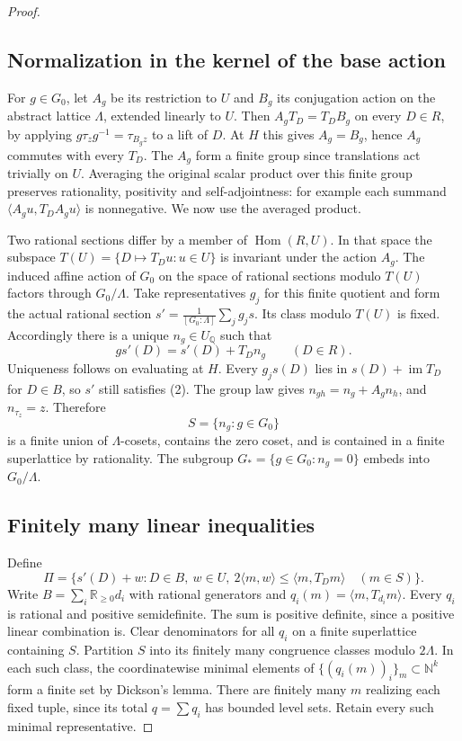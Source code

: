 \documentclass[11pt]{article}
\begin{document}
\begin{proof}
\subsection*{Normalization in the kernel of the base action}

For \(g\in G_0\), let \(A_g\) be its restriction to \(U\) and \(B_g\) its conjugation action on the abstract lattice \(\Lambda\), extended linearly to \(U\). Then \(A_g T_D=T_D B_g\) on every \(D\in R\), by applying \(g\tau_z g^{-1}=\tau_{B_gz}\) to a lift of \(D\). At \(H\) this gives \(A_g=B_g\), hence \(A_g\) commutes with every \(T_D\). The \(A_g\) form a finite group since translations act trivially on \(U\). Averaging the original scalar product over this finite group preserves rationality, positivity and self-adjointness: for example each summand \(\langle A_gu,T_D A_gu\rangle\) is nonnegative. We now use the averaged product.

Two rational sections differ by a member of \(\operatorname{Hom}(R,U)\). In that space the subspace \(T(U)=\{D\mapsto T_Du:u\in U\}\) is invariant under the action \(A_g\). The induced affine action of \(G_0\) on the space of rational sections modulo \(T(U)\) factors through \(G_0/\Lambda\). Take representatives \(g_j\) for this finite quotient and form the actual rational section \(s'=\frac1{[G_0:\Lambda]}\sum_j g_j s\). Its class modulo \(T(U)\) is fixed. Accordingly there is a unique \(n_g\in U_\mathbb Q\) such that \[
  g s'(D)=s'(D)+T_D n_g\qquad(D\in R).
\] Uniqueness follows on evaluating at \(H\). Every \(g_js(D)\) lies in \(s(D)+\operatorname{im}T_D\) for \(D\in B\), so \(s'\) still satisfies (2). The group law gives \(n_{gh}=n_g+A_g n_h\), and \(n_{\tau_z}=z\). Therefore \[
S=\{n_g:g\in G_0\}
\] is a finite union of \(\Lambda\)-cosets, contains the zero coset, and is contained in a finite superlattice by rationality. The subgroup \(G_*=\{g\in G_0:n_g=0\}\) embeds into \(G_0/\Lambda\).

\subsection*{Finitely many linear inequalities}

Define \[
\Pi=\bigl\{s'(D)+w:D\in B,\ w\in U,\
 2\langle m,w\rangle\le \langle m,T_Dm\rangle \quad(m\in S)\bigr\}.
\] Write \(B=\sum_i\mathbb R_{\ge0}d_i\) with rational generators and \(q_i(m)=\langle m,T_{d_i}m\rangle\). Every \(q_i\) is rational and positive semidefinite. The sum is positive definite, since a positive linear combination is. Clear denominators for all \(q_i\) on a finite superlattice containing \(S\). Partition \(S\) into its finitely many congruence classes modulo \(2\Lambda\). In each such class, the coordinatewise minimal elements of \(\{(q_i(m))_i\}_m\subset\mathbb N^k\) form a finite set by Dickson's lemma. There are finitely many \(m\) realizing each fixed tuple, since its total \(q=\sum q_i\) has bounded level sets. Retain every such minimal representative.


\end{proof}
\end{document}
